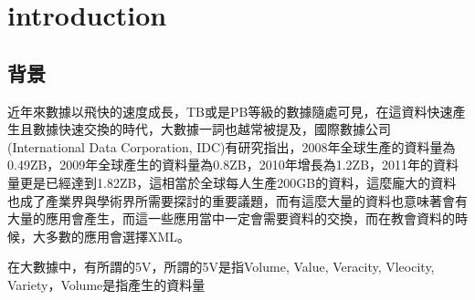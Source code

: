 \section{introduction}
\subsection{背景}
近年來數據以飛快的速度成長，TB或是PB等級的數據隨處可見，在這資料快速產生且數據快速交換的時代，大數據一詞也越常被提及，國際數據公司(International Data Corporation, IDC)有研究指出，2008年全球生產的資料量為0.49ZB，2009年全球產生的資料量為0.8ZB，2010年增長為1.2ZB，2011年的資料量更是已經達到1.82ZB，這相當於全球每人生產200GB的資料，這麼龐大的資料也成了產業界與學術界所需要探討的重要議題，而有這麼大量的資料也意味著會有大量的應用會產生，而這一些應用當中一定會需要資料的交換，而在教會資料的時候，大多數的應用會選擇XML。\\\par
在大數據中，有所謂的5V，所謂的5V是指Volume, Value, Veracity, Vleocity, Variety，Volume是指產生的資料量
